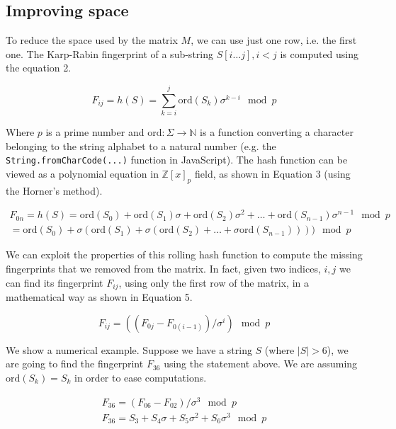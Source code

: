 \documentclass{article}
\begin{document}
\subsection{Improving space}

To reduce the space used by the matrix $M$, we can use just one row, i.e. the first one. The Karp-Rabin fingerprint of a sub-string $S[i \dots j], i < j$ is computed using the equation 2.

\begin{equation}
    F_{ij} = h(S) = \sum_{k = i}^{j} \textrm{ord}(S_k) \sigma^{k - i} \mod p
\end{equation}

\noindent Where $p$ is a prime number and $\textrm{ord}: \Sigma \to \mathbb{N}$ is a function converting a character belonging to the string alphabet to a natural number (e.g. the \verb+String.fromCharCode(...)+ function in JavaScript). The hash function can be viewed as a polynomial equation in $\mathbb{Z}[x]_p$ field, as shown in Equation 3 (using the Horner's method).

\begin{align}
    F_{0n} = h(S) = \textrm{ord}(S_0) + \textrm{ord}(S_1) \sigma + \textrm{ord}(S_2) \sigma^2 + \dots + \textrm{ord}(S_{n-1}) \sigma^{n - 1} \mod p \\
    = \textrm{ord}(S_0) + \sigma(\textrm{ord}(S_1) + \sigma ( \textrm{ord}(S_2) + \dots + \sigma\textrm{ord}(S_{n - 1})))) \mod p
\end{align}

\noindent We can exploit the properties of this rolling hash function to compute the missing fingerprints that we removed from the matrix. In fact, given two indices, $i, j$ we can find its fingerprint $F_{ij}$, using only the first row of the matrix, in a mathematical way as shown in Equation 5.

\begin{equation}
    F_{ij} = ((F_{0j} - F_{0(i - 1)}) / \sigma^{i}) \mod p
\end{equation}

\noindent We show a numerical example. Suppose we have a string $S$ (where $|S| > 6$), we are going to find the fingerprint $F_{36}$ using the statement above. We are assuming $\textrm{ord}(S_k) = S_k$ in order to ease computations.

\begin{align}
    F_{36} = (F_{06} - F_{02}) / \sigma^{3} \mod p \\
    F_{36} = S_3 + S_4 \sigma + S_5 \sigma^2  + S_6 \sigma^3 \mod p
\end{align}
\end{document}
